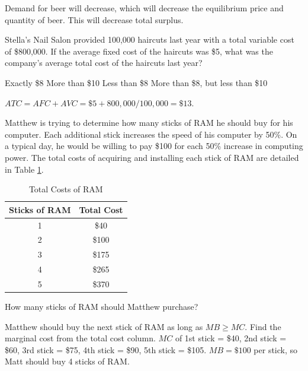 \documentclass[addpoints,11pt]{exam}
\theoremstyle{definition}
\begin{document}
\begin{questions}
\begin{solution}
	Demand for beer will decrease, which will decrease the equilibrium price and quantity of beer. This will decrease total surplus.
\end{solution}


\question Stella's Nail Salon provided 100,000 haircuts last year with a total variable cost of \$800,000. If the average fixed cost of the haircuts was \$5, what was the company's average total cost of the haircuts last year?


\begin{choices}
	\choice Exactly \$8
	\CorrectChoice More than \$10
	\choice Less than \$8
	\choice More than \$8, but less than \$10
\end{choices}

\begin{solution}
	$ATC = AFC + AVC = \$5 + 800,000/100,000 = \$13$.
\end{solution}
	
	\question Matthew is trying to determine how many sticks of RAM he should buy for his computer. Each additional stick increases the speed of his computer by 50\%. On a typical day, he would be willing to pay \$100 for each 50\% increase in computing power. The total costs of acquiring and installing each stick of RAM are detailed in Table \ref{MC30}. 
	
	\begin{table}[H]
		\caption{Total Costs of RAM}
		\centering
		\begin{tabular}{c|c} 
			
			 Sticks of RAM &  Total Cost\\
			\hline
			1 & \$40 \\
			2 & \$100  \\
			3 & \$175 \\
			4 & \$265 \\
			5 & \$370 
		\end{tabular}
		\label{MC30}
	\end{table}

	How many sticks of RAM should Matthew purchase?

	\begin{choices}
	\end{choices}
	
	\begin{solution}
		Matthew should buy the next stick of RAM as long as $MB \ge MC$. Find the marginal cost from the total cost column. $MC$ of 1st stick = \$40, 2nd stick = \$60, 3rd stick = \$75, 4th stick = \$90, 5th stick = \$105.  $MB = \$100$ per stick, so Matt should buy 4 sticks of RAM.
	\end{solution}
	

\end{questions}
\end{document}
